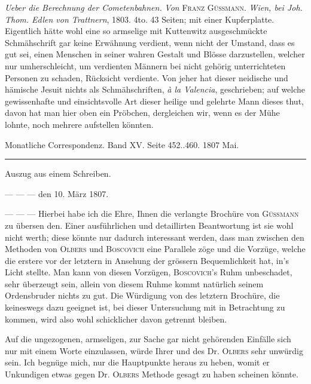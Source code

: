 \expandafter\def\csname HistoricalNoteText491\endcsname{\emph{Ueber die Berechnung der Cometenbahnen.} \emph{Von} \textsc{Franz Güssmann}. \emph{Wien, bei Joh. Thom. Edlen von Trattnern}, 1803. 4to. 43 Seiten; mit einer Kupferplatte. Eigentlich hätte wohl eine so armselige mit Kuttenwitz ausgeschmückte Schmähschrift gar keine Erwähnung verdient, wenn nicht der Umstand, dass es gut sei, einen Menschen in seiner wahren Gestalt und Blösse darzustellen, welcher nur umherschleicht, um verdienten Männern bei nicht gehörig unterrichteten Personen zu schaden, Rücksicht verdiente. Von jeher hat dieser neidische und hämische Jesuit nichts als Schmähschriften, \emph{à la Valencia}, geschrieben; auf welche gewissenhafte und einsichtsvolle Art dieser heilige und gelehrte Mann dieses thut, davon hat man hier oben ein Pröbchen, dergleichen wir, wenn es der Mühe lohnte, noch mehrere aufstellen könnten.}
\clearpage
{}
\hypertarget{native-491-lower}{}\label{native-491-lower}
\begin{center}
\small Monatliche Correspondenz. Band XV. Seite 452..460. 1807 Mai.\\[3pt]
\rule{.72\linewidth}{.3pt}
\end{center}
\begin{center}Auszug aus einem Schreiben.\end{center}
\begin{flushright}--- --- --- den 10. März 1807.\end{flushright}

--- --- --- Hierbei habe ich die Ehre, Ihnen die verlangte Brochüre von \textsc{Güssmann} zu übersen%
%
den. Einer ausführlichen und detaillirten Beantwortung ist sie wohl nicht werth; diese könnte nur dadurch interessant werden, dass man zwischen den Methoden von \textsc{Olbers} und \textsc{Boscovich} eine Parallele zöge und die Vorzüge, welche die erstere vor der letztern in Ansehung der grössern Bequemlichkeit hat, in's Licht stellte. Man kann von diesen Vorzügen, \textsc{Boscovich}'s Ruhm unbeschadet, sehr überzeugt sein, allein von diesem Ruhme kommt natürlich seinem Ordensbruder nichts zu gut. Die Würdigung von des letztern Brochüre, die keineswegs dazu geeignet ist, bei dieser Untersuchung mit in Betrachtung zu kommen, wird also wohl schicklicher davon getrennt bleiben.

Auf die ungezogenen, armseligen, zur Sache gar nicht gehörenden Einfälle sich nur mit einem Worte einzulassen, würde Ihrer und des Dr. \textsc{Olbers} sehr unwürdig sein. Ich begnüge mich, nur die Hauptpunkte heraus zu heben, womit er Unkundigen etwas gegen Dr. \textsc{Olbers} Methode gesagt zu haben scheinen könnte.

